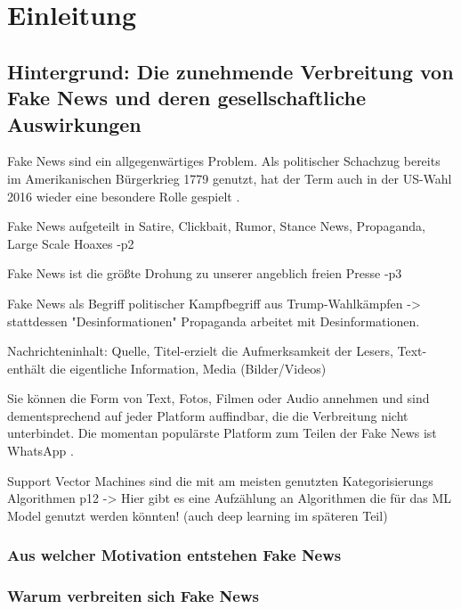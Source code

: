 \chapter{Einleitung}
\label{chap:einleitung}

\section{Hintergrund: Die zunehmende Verbreitung von Fake News und deren gesellschaftliche Auswirkungen}
\label{sec:hintergrund}

Fake News sind ein allgegenwärtiges Problem. Als politischer Schachzug bereits im Amerikanischen Bürgerkrieg 1779 genutzt, 
hat der Term auch in der US-Wahl 2016 wieder eine besondere Rolle gespielt \cite{Sharma:2024}.

Fake News aufgeteilt in Satire, Clickbait, Rumor, Stance News, Propaganda, Large Scale Hoaxes \cite{Sharma:2024}-p2

Fake News ist die größte Drohung zu unserer angeblich freien Presse \cite{Sharma:2024}-p3

Fake News als Begriff politischer Kampfbegriff aus Trump-Wahlkämpfen -> stattdessen "Desinformationen" \cite{buerker2022fakenews}
Propaganda arbeitet mit Desinformationen. \cite{buerker2022fakenews}

Nachrichteninhalt: Quelle, Titel-erzielt die Aufmerksamkeit der Lesers, Text-enthält die eigentliche Information, Media (Bilder/Videos)

Sie können die Form von Text, Fotos, Filmen oder Audio annehmen und sind dementsprechend auf jeder Platform auffindbar, 
die die Verbreitung nicht unterbindet. Die momentan populärste Platform zum Teilen der Fake News ist WhatsApp \cite{Ashish2024}.

Support Vector Machines sind die mit am meisten genutzten Kategorisierungs Algorithmen \cite{Sharma:2024}p12
-> Hier gibt es eine Aufzählung an Algorithmen die für das ML Model genutzt werden könnten! (auch deep learning im späteren Teil)

\subsection{Aus welcher Motivation entstehen Fake News}


\subsection{Warum verbreiten sich Fake News}

